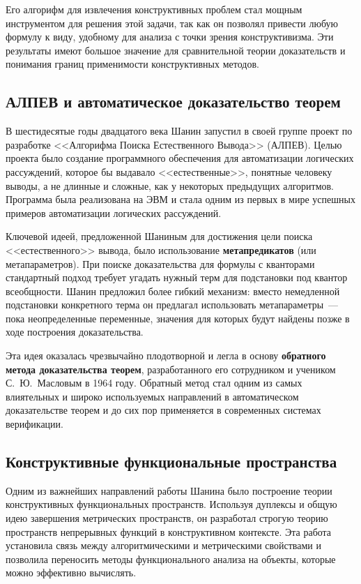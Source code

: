 \documentclass[essay,paper]{pmk-graduate}
\begin{document}
Его алгорифм для извлечения конструктивных проблем стал мощным инструментом для решения этой задачи, так как он позволял привести любую формулу к виду, удобному для анализа с точки зрения конструктивизма. Эти результаты имеют большое значение для сравнительной теории доказательств и понимания границ применимости конструктивных методов.

\subsection{АЛПЕВ и автоматическое доказательство теорем}

В шестидесятые годы двадцатого века Шанин запустил в своей группе проект по разработке <<Алгорифма Поиска Естественного Вывода>> (АЛПЕВ). Целью проекта было создание программного обеспечения для автоматизации логических рассуждений, которое бы выдавало <<естественные>>, понятные человеку выводы, а не длинные и сложные, как у некоторых предыдущих алгоритмов. Программа была реализована на ЭВМ и стала одним из первых в мире успешных примеров автоматизации логических рассуждений.

Ключевой идеей, предложенной Шаниным для достижения цели поиска <<естественного>> вывода, было использование \textbf{метапредикатов} (или метапараметров). При поиске доказательства для формулы с кванторами стандартный подход требует угадать нужный терм для подстановки под квантор всеобщности. Шанин предложил более гибкий механизм: вместо немедленной подстановки конкретного терма он предлагал использовать метапараметры~--- пока неопределенные переменные, значения для которых будут найдены позже в ходе построения доказательства.

Эта идея оказалась чрезвычайно плодотворной и легла в основу \textbf{обратного метода доказательства теорем}, разработанного его сотрудником и учеником С.~Ю.~Масловым в 1964 году. Обратный метод стал одним из самых влиятельных и широко используемых направлений в автоматическом доказательстве теорем и до сих пор применяется в современных системах верификации.

\subsection{Конструктивные функциональные пространства}

Одним из важнейших направлений работы Шанина было построение теории конструктивных функциональных пространств. Используя дуплексы и общую идею завершения метрических пространств, он разработал строгую теорию пространств непрерывных функций в конструктивном контексте. Эта работа установила связь между алгоритмическими и метрическими свойствами и позволила переносить методы функционального анализа на объекты, которые можно эффективно вычислять.
\end{document}
